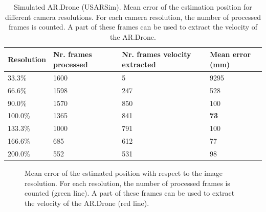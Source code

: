 \begin{table}[htb!]
    \centering
    \begin{tabular}
        { | l | l | l | l | } 
	\hline
	Resolution & Nr. frames processed & Nr. frames velocity extracted & Mean error (mm) \\
        \hline
        33.3\% & 1600 & 5 & 9295 \\
	66.6\% & 1598 & 247 & 528 \\
	90.0\% & 1570 & 850 & 100 \\
	100.0\% & 1365 & 841 & \textbf{73} \\
	133.3\% & 1000 & 791 & 100 \\
	166.6\% & 685 & 612 & 77 \\
	200.0\% & 552 & 531 & 98 \\
	\hline
    \end{tabular}
    \caption{Simulated AR.Drone (USARSim). Mean error of the estimation position for different camera resolutions. For each camera resolution, the number of processed frames is counted. A part of these frames can be used to extract the velocity of the AR.Drone.}
    \label{tab:res-resolution-usar}
\end{table}


\begin{figure}[htb!]
  \begin{center}

 \end{center}
  \caption{Mean error of the estimated position with respect to the image resolution. For each resolution, the number of processed frames is counted (green line). A part of these frames can be used to extract the velocity of the AR.Drone (red line).}
  \label{fig:exp3-error2}
\end{figure}


